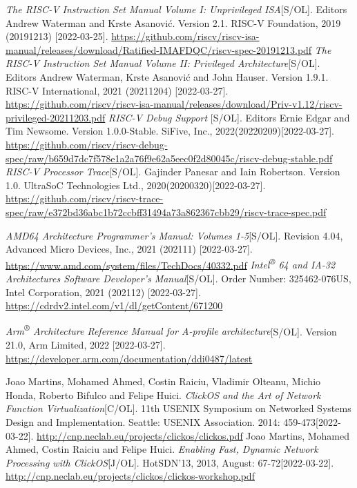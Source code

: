 \documentclass{../runikraft-report}
\begin{document}
\begin{thebibliography}{99}
 \textit{The RISC-V Instruction Set Manual
Volume I: Unprivileged ISA}[S/OL]. Editors Andrew Waterman and Krste Asanović. Version 2.1. RISC-V Foundation, 2019 (20191213) [2022-03-25]. \url{https://github.com/riscv/riscv-isa-manual/releases/download/Ratified-IMAFDQC/riscv-spec-20191213.pdf}
 \textit{The RISC-V Instruction Set Manual
Volume II: Privileged Architecture}[S/OL]. Editors Andrew Waterman, Krste Asanović and John Hauser.
Version 1.9.1. RISC-V International, 2021 (20211204) [2022-03-27]. \url{https://github.com/riscv/riscv-isa-manual/releases/download/Priv-v1.12/riscv-privileged-20211203.pdf}
 \textit{RISC-V Debug Support
}[S/OL]. Editors Ernie Edgar and Tim Newsome. Version 1.0.0-Stable. SiFive, Inc., 2022(20220209)[2022-03-27]. \url{https://github.com/riscv/riscv-debug-spec/raw/b659d7dc7f578e1a2a76f9e62a5eec0f2d80045c/riscv-debug-stable.pdf}
 \textit{RISC-V Processor Trace}[S/OL]. Gajinder Panesar and
Iain Robertson. Version 1.0. UltraSoC Technologies Ltd., 2020(20200320)[2022-03-27]. \url{https://github.com/riscv/riscv-trace-spec/raw/e372bd36abc1b72ccbff31494a73a862367cbb29/riscv-trace-spec.pdf}

 \textit{AMD64 Architecture Programmer's Manual: Volumes 1-5}[S/OL]. Revision 4.04, Advanced Micro Devices, Inc., 2021 (202111) [2022-03-27]. \url{https://www.amd.com/system/files/TechDocs/40332.pdf}
 \textit{Intel\textsuperscript{®} 64 and IA-32 Architectures Software Developer’s Manual}[S/OL]. Order Number: 325462-076US, Intel Corporation, 2021 (202112) [2022-03-27]. \url{https://cdrdv2.intel.com/v1/dl/getContent/671200}

 \textit{Arm\textsuperscript{®} Architecture Reference Manual
for A-profile architecture}[S/OL]. Version 21.0, Arm Limited, 2022 [2022-03-27]. \url{https://developer.arm.com/documentation/ddi0487/latest}

 Joao Martins, Mohamed Ahmed, Costin Raiciu, Vladimir Olteanu,
Michio Honda, Roberto Bifulco and Felipe Huici. \textit{ClickOS and the Art of Network Function Virtualization}[C/OL]. 11th USENIX Symposium on Networked Systems
Design and Implementation. Seattle: USENIX Association. 2014: 459-473[2022-03-22]. \url{http://cnp.neclab.eu/projects/clickos/clickos.pdf}
 Joao Martins, Mohamed Ahmed, Costin Raiciu and Felipe Huici.
\textit{Enabling Fast, Dynamic Network Processing with ClickOS}[J/OL]. HotSDN'13, 2013, August: 67-72[2022-03-22]. \url{http://cnp.neclab.eu/projects/clickos/clickos-workshop.pdf}


\end{thebibliography}
\end{document}
